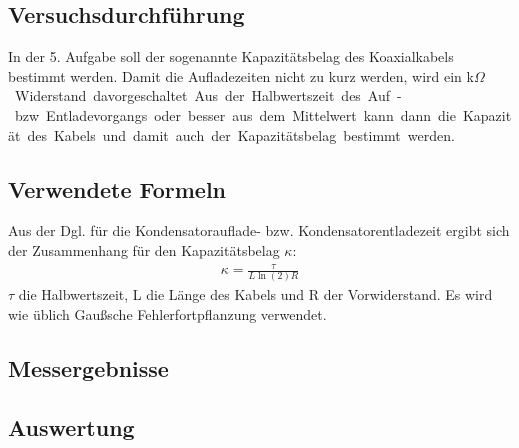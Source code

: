 \documentclass[12pt,a4paper]{article}
\begin{document}
\subsection{Versuchsdurchführung}
In der 5. Aufgabe soll der sogenannte Kapazitätsbelag des Koaxialkabels bestimmt werden. Damit die Aufladezeiten nicht zu kurz werden, wird ein \unit[10]{k$\Omega$} Widerstand davorgeschaltet. Aus der Halbwertszeit des Auf- bzw. Entladevorgangs oder besser aus dem Mittelwert kann dann die Kapazität des Kabels und damit auch der Kapazitätsbelag bestimmt werden.
\subsection{Verwendete Formeln}
Aus der Dgl. für die Kondensatorauflade- bzw. Kondensatorentladezeit ergibt sich der Zusammenhang für den Kapazitätsbelag $\kappa$:
\begin{align}
 \kappa = \frac{\tau}{L \ln(2) R}
\end{align}
$\tau$ die Halbwertszeit, L die Länge des Kabels und R der Vorwiderstand. Es wird wie üblich Gaußsche Fehlerfortpflanzung verwendet.
\subsection{Messergebnisse}
\subsection{Auswertung}
\end{document}

